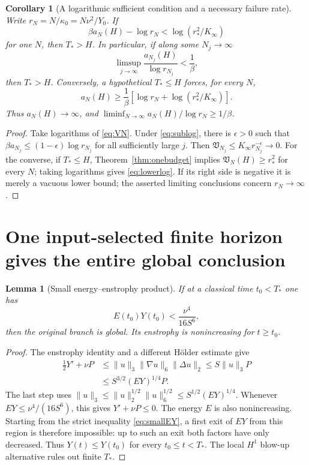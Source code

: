 \documentclass[11pt,a4paper]{article}
\newtheorem{lemma}[theorem]{Lemma}
\newtheorem{corollary}[theorem]{Corollary}
\theoremstyle{definition}\newtheorem{definition}[theorem]{Definition}
\theoremstyle{remark}\newtheorem{remark}[theorem]{Remark}
\newcommand{\norm}[1]{\lVert #1\rVert}
\newcommand{\rstar}{r_*}
\newcommand{\kin}{\kappa_0}
\newcommand{\Kinf}{K_\infty}
\numberwithin{equation}{section}
\begin{document}
\begin{corollary}[A logarithmic sufficient condition and a necessary failure rate]\label{cor:log}
Write $r_N=N/\kin=N\nu^2/Y_0$. If
\begin{equation}\label{eq:logtest}
 \beta a_N(H)-\log r_N<\log(\rstar^2/\Kinf)
\end{equation}
for one $N$, then $T_*>H$. In particular, if along some $N_j\to\infty$
\begin{equation}\label{eq:sublog}
 \limsup_{j\to\infty}\frac{a_{N_j}(H)}{\log r_{N_j}}<\frac1\beta,
\end{equation}
then $T_*>H$. Conversely, a hypothetical $T_*\le H$ forces, for every $N$,
\begin{equation}\label{eq:lowerlog}
 a_N(H)\ge\frac1\beta\left[\log r_N+\log(\rstar^2/\Kinf)\right].
\end{equation}
Thus $a_N(H)\to\infty$, and $\liminf_{N\to\infty}a_N(H)/\log r_N\ge1/\beta$.
\end{corollary}
\begin{proof}
Take logarithms of \eqref{eq:VN}. Under \eqref{eq:sublog}, there is $\epsilon>0$ such that $\beta a_{N_j}\le(1-\epsilon)\log r_{N_j}$ for all sufficiently large $j$. Then $\mathfrak V_{N_j}\le\Kinf r_{N_j}^{-\epsilon}\to0$. For the converse, if $T_*\le H$, Theorem~\ref{thm:onebudget} implies $\mathfrak V_N(H)\ge\rstar^2$ for every $N$; taking logarithms gives \eqref{eq:lowerlog}. If its right side is negative it is merely a vacuous lower bound; the asserted limiting conclusions concern $r_N\to\infty$.
\end{proof}

\section{One input-selected finite horizon gives the entire global conclusion}
\label{sec:finitehorizon}
\begin{lemma}[Small energy--enstrophy product]\label{lem:smallEY}
If at a classical time $t_0<T_*$ one has
\begin{equation}\label{eq:smallEY}
 E(t_0)Y(t_0)<\frac{\nu^4}{16S^6},
\end{equation}
then the original branch is global. Its enstrophy is nonincreasing for $t\ge t_0$.
\end{lemma}
\begin{proof}
The enstrophy identity and a different H\"older estimate give
\begin{align*}
 \tfrac12Y'+\nu P
 &\le\norm u_3\norm{\nabla u}_6\norm{\Delta u}_2
 \le S\norm u_3 P\\
 &\le S^{3/2}(EY)^{1/4}P.
\end{align*}
The last step uses $\norm u_3\le\norm u_2^{1/2}\norm u_6^{1/2}\le S^{1/2}(EY)^{1/4}$. Whenever $EY\le\nu^4/(16S^6)$, this gives $Y'+\nu P\le0$. The energy $E$ is also nonincreasing. Starting from the strict inequality \eqref{eq:smallEY}, a first exit of $EY$ from this region is therefore impossible: up to such an exit both factors have only decreased. Thus $Y(t)\le Y(t_0)$ for every $t_0\le t<T_*$. The local $H^1$ blow-up alternative rules out finite $T_*$.
\end{proof}
\end{document}
